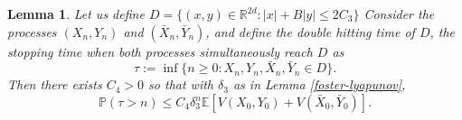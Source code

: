 \documentclass{article}
\newtheorem{lemma}[theorem]{Lemma}
\def\mP{\mathbb{P}}
\begin{document}
\begin{lemma}
\label{lemmataud} 
Let us define $D= \{(x,y)\in \mathbb{R}^{2d}: |x|+B|y|\leq 2C_3\}$ 
Consider the processes $(X_n,Y_n)$ and $(\bar X_n, \bar Y_n)$, and define the double hitting time of $D$, the stopping time when both processes simultaneously reach $D$ as
$$
   \tau:=\inf\{n\geq 0: X_n,Y_n,\bar{X}_n,\bar{Y}_n\in D\}.
   $$
   Then there exists $C_4>0$ so that with $\delta_3$ as in Lemma \ref{foster-lyapunov},
   \begin{equation}\label{taud}
    \mP(\tau > n)\leq C_4\delta_3 ^n \mathbb{E}[V(X_0,Y_0)+V(\bar X_0,\bar Y_0)].
\end{equation}
\end{lemma}
\end{document}
